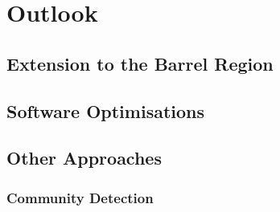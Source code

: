 





\section{Outlook}
\subsection{Extension to the Barrel Region}
\subsection{Software Optimisations}

\subsection{Other Approaches}
\subsubsection{Community Detection}


